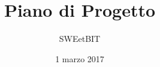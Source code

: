 



\title{\textbf{Piano di Progetto}}
\author{SWEetBIT}

\date{1 marzo 2017}




\makeFrontPage

\tableofcontents




